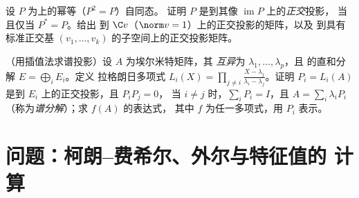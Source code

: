 \begin{exercise}[$\star\star$]\label{exo:b2:hermitian:11}
设 $P$ 为上的幂等（$P^2 = P$）自同态。
证明 $P$ 是到其像 $\operatorname{im} P$ 上的\emph{正交}投影，
当且仅当 $P^* = P$。给出
到 $\C v$（$\norm v = 1$）上的正交投影的矩阵，以及
到具有标准正交基 $(v_1, \dots, v_k)$ 的子空间上的正交投影矩阵。
\end{exercise}

\begin{exercise}[$\star\star\star$]\label{exo:b2:hermitian:12}
（用插值法求谱投影）设 $A$ 为埃尔米特矩阵，其
\emph{互异}为 $\lambda_1, \dots, \lambda_p$，且
的直和分解 $E = \bigoplus_i E_i$。定义
拉格朗日多项式 $L_i(X) = \prod_{j\neq i}\frac{X -
\lambda_j}{\lambda_i - \lambda_j}$。证明 $P_i = L_i(A)$
是到 $E_i$ 上的正交投影，且 $P_iP_j = 0$，
当 $i \neq j$ 时，$\sum_i P_i = I$，且 $A = \sum_i \lambda_iP_i$
（称为\emph{谱分解}）；求 $f(A)$ 的表达式，
其中 $f$ 为任一多项式，用 $P_i$ 表示。
\end{exercise}

\section{问题：柯朗–费希尔、外尔与特征值的
计算}

